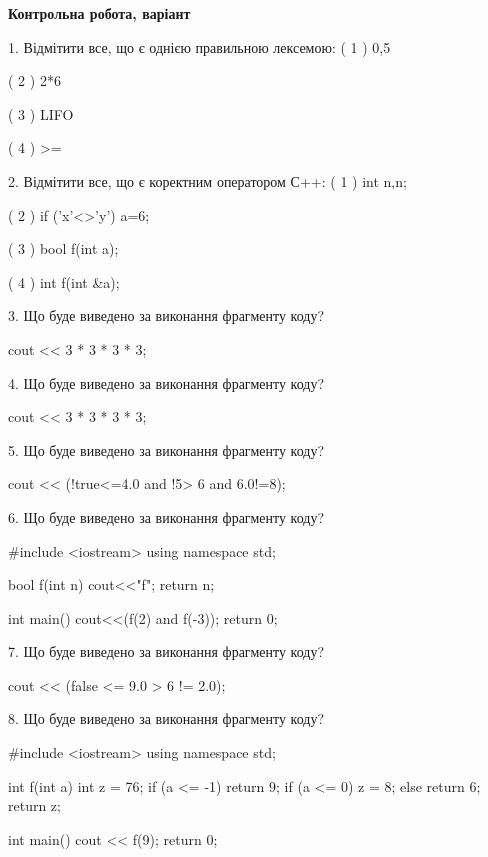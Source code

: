 \documentclass[11pt, ukrainian]{article}
\begin{document}
\begin{large}
\textbf{Контрольна робота, варіант }\par

1. Відмітити все, що є однією правильною лексемою:
( 1 ) 0,5

( 2 ) 2*6

( 3 ) LIFO

( 4 ) >=


2. Відмітити все, що є коректним оператором С++:
( 1 ) int n,n;

( 2 ) if ('x'<>'y') a=6;

( 3 ) bool f(int a);

( 4 ) int f(int &a);


3. Що буде виведено за виконання фрагменту коду?

cout << 3 * 3 * 3 * 3;


4. Що буде виведено за виконання фрагменту коду?

cout << 3 * 3 * 3 * 3;


5. Що буде виведено за виконання фрагменту коду?

cout << (!true<=4.0 and !5> 6 and 6.0!=8);


6. Що буде виведено за виконання фрагменту коду?

#include <iostream>
using namespace std;

bool f(int n){
    cout<<"f";
    return n;
}

int main(){
    cout<<(f(2) and f(-3));
    return 0;
}


7. Що буде виведено за виконання фрагменту коду?

cout << (false <= 9.0 > 6 != 2.0);


8. Що буде виведено за виконання фрагменту коду?

#include <iostream>
using namespace std;

int f(int a){
    int z = 76;
    if (a <= -1) 
        return 9;
    if (a <= 0)
         z = 8;
    else
         return 6;
    return z;
}

int main(){
    cout << f(9);
    return 0;
}



\end{large}
\end{document}
